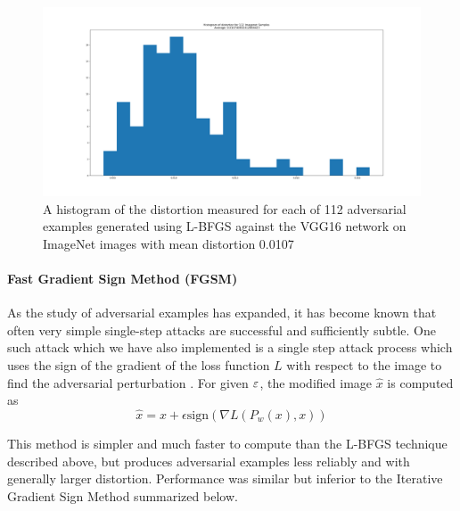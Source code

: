 
\begin{figure}[H]
\label{lbfgsi}
\includegraphics[trim=200 80 100 100, clip,width=14cm]{c1_figures/distortion_hist.png}
\caption{A histogram of the distortion measured for each of 112 adversarial examples generated using L-BFGS against the VGG16 network on ImageNet images with mean distortion 0.0107}
\end{figure}

\paragraph{Fast Gradient Sign Method (FGSM)} 

As the study of adversarial examples has expanded, it has become known
that often very simple single-step attacks are successful and
sufficiently subtle. One such attack which we have also implemented is
a single step attack process which uses the sign of the gradient of
the loss function $L$  with respect to the image to find the
adversarial perturbation  \cite{goodfellow_explaining_2014}. For given
$\varepsilon$, the modified  image $\hat x$ is computed as
\begin{equation}
\hat{x} = x + \epsilon \text{sign} (\nabla L (P_w(x),x))
\end{equation}

This method is simpler and much faster to compute than the L-BFGS technique described above, but produces adversarial examples less reliably and with generally larger distortion. Performance was similar but inferior to the Iterative Gradient Sign Method summarized below.  

